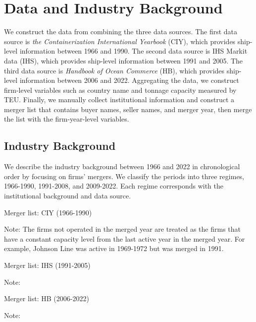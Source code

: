\documentclass[10pt]{article}
\begin{document}
\section{Data and Industry Background}

We construct the data from combining the three data sources. 
The first data source is \textit{the Containerization International Yearbook} (CIY), which provides ship-level information between 1966 and 1990.
The second data source is IHS Markit data (IHS), which provides ship-level information between 1991 and 2005.
The third data source is \textit{Handbook of Ocean Commerce} (HB), which provides ship-level information between 2006 and 2022. 
Aggregating the data, we construct firm-level variables such as country name and tonnage capacity measured by TEU. 
Finally, we manually collect institutional information and construct a merger list that contains buyer names, seller names, and merger year, then merge the list with the firm-year-level variables. 

\subsection{Industry Background}
We describe the industry background between 1966 and 2022 in chronological order by focusing on firms' mergers. We classify the periods into three regimes, 1966-1990, 1991-2008, and 2009-2022. Each regime corresponds with the institutional background and data source.

\begin{table}[!htbp]
  \begin{center}
      \caption{Merger list: CIY (1966-1990)}
      \label{tb:merger_list_CIY} 
      
  \end{center}\footnotesize
  Note: The firms not operated in the merged year are treated as the firms that have a constant capacity level from the last active year in the merged year. For example, Johnson Line was active in 1969-1972 but was merged in 1991.
\end{table} 

\begin{table}[!htbp]
  \begin{center}
      \caption{Merger list: IHS (1991-2005)}
      \label{tb:merger_list_IHS} 
      
  \end{center}\footnotesize
  Note: 
\end{table} 

\begin{table}[!htbp]
  \begin{center}
      \caption{Merger list: HB (2006-2022)}
      \label{tb:merger_list_HB} 
      
  \end{center}\footnotesize
  Note:
\end{table} 
\end{document}
